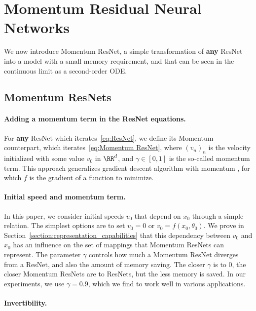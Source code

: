 \documentclass{article}
\begin{document}
\section{Momentum Residual Neural Networks}\label{section:mom_net}
We now introduce Momentum ResNet, a simple transformation of \textbf{any} ResNet into a model with a small memory requirement, and that can be seen in the continuous limit as a second-order ODE.
\vspace{-1em}
\subsection{Momentum ResNets}\label{section:Momentum_nets}

\paragraph{Adding a momentum term in the ResNet equations.}

For \textbf{any} ResNet which iterates~\eqref{eq:ResNet},
we define its Momentum counterpart, which iterates~\eqref{eq:Momentum ResNet},
where $(v_n)_n$ is the velocity  initialized with some value $v_0$ in $\RR^d$, and $\gamma \in [0,1]$ is the so-called momentum term. This approach generalizes gradient descent algorithm with momentum \citep{ruder2016overview},
for which $f$ is the gradient of a function to minimize. 

\paragraph{Initial speed and momentum term.}

 In this paper, we consider initial speeds $v_0$ that depend on $x_0$ through a simple relation. The simplest options are to set $v_0 = 0$ or $v_0 = f(x_0,\theta_0)$. We prove in Section~\ref{section:representation_capabilities} that this dependency between $v_0$ and $x_0$ has an influence on the set of mappings that Momentum ResNets can represent.
The parameter $\gamma$ controls how much a Momentum ResNet diverges from a ResNet, and also the amount of memory saving. The closer $\gamma$ is to $0$, the closer Momentum ResNets are to ResNets, but the less memory is saved. In our experiments, we use $\gamma =0.9$, which we find to work well in various applications.

\paragraph{Invertibility.}
\end{document}
